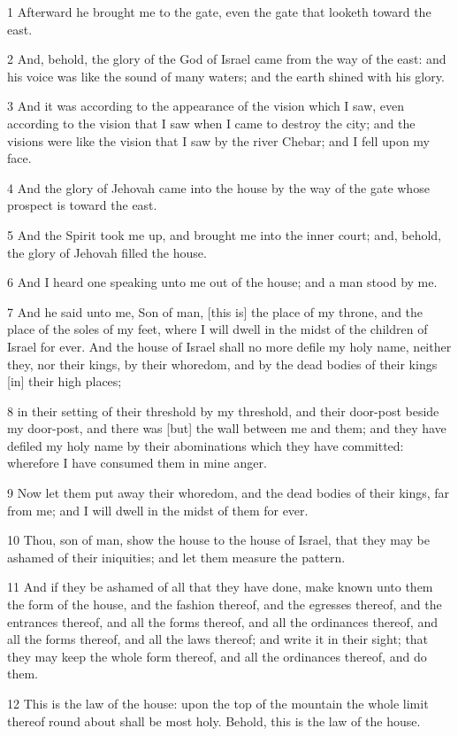 \par 1 Afterward he brought me to the gate, even the gate that looketh toward the east.
\par 2 And, behold, the glory of the God of Israel came from the way of the east: and his voice was like the sound of many waters; and the earth shined with his glory.
\par 3 And it was according to the appearance of the vision which I saw, even according to the vision that I saw when I came to destroy the city; and the visions were like the vision that I saw by the river Chebar; and I fell upon my face.
\par 4 And the glory of Jehovah came into the house by the way of the gate whose prospect is toward the east.
\par 5 And the Spirit took me up, and brought me into the inner court; and, behold, the glory of Jehovah filled the house.
\par 6 And I heard one speaking unto me out of the house; and a man stood by me.
\par 7 And he said unto me, Son of man, [this is] the place of my throne, and the place of the soles of my feet, where I will dwell in the midst of the children of Israel for ever. And the house of Israel shall no more defile my holy name, neither they, nor their kings, by their whoredom, and by the dead bodies of their kings [in] their high places;
\par 8 in their setting of their threshold by my threshold, and their door-post beside my door-post, and there was [but] the wall between me and them; and they have defiled my holy name by their abominations which they have committed: wherefore I have consumed them in mine anger.
\par 9 Now let them put away their whoredom, and the dead bodies of their kings, far from me; and I will dwell in the midst of them for ever.
\par 10 Thou, son of man, show the house to the house of Israel, that they may be ashamed of their iniquities; and let them measure the pattern.
\par 11 And if they be ashamed of all that they have done, make known unto them the form of the house, and the fashion thereof, and the egresses thereof, and the entrances thereof, and all the forms thereof, and all the ordinances thereof, and all the forms thereof, and all the laws thereof; and write it in their sight; that they may keep the whole form thereof, and all the ordinances thereof, and do them.
\par 12 This is the law of the house: upon the top of the mountain the whole limit thereof round about shall be most holy. Behold, this is the law of the house.
